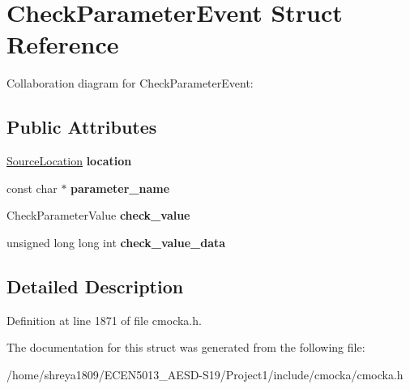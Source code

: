 \hypertarget{structCheckParameterEvent}{}\section{Check\+Parameter\+Event Struct Reference}
\label{structCheckParameterEvent}


Collaboration diagram for Check\+Parameter\+Event\+:
\subsection*{Public Attributes}
\begin{DoxyCompactItemize}
\item 
\mbox{\label{structCheckParameterEvent_afc7dc3d8ae3fcfd65b8b91cfe69f5538}} 
\hyperlink{structSourceLocation}{Source\+Location} {\bfseries location}
\item 
\mbox{\label{structCheckParameterEvent_ae8b4f5e2577e0f749da52a10ac8be8bf}} 
const char $\ast$ {\bfseries parameter\+\_\+name}
\item 
\mbox{\label{structCheckParameterEvent_a2328aae7eccb900e6f3329b7a5e34461}} 
Check\+Parameter\+Value {\bfseries check\+\_\+value}
\item 
\mbox{\label{structCheckParameterEvent_a3641ddfccd5868c1db7225cd4fe3d10b}} 
unsigned long long int {\bfseries check\+\_\+value\+\_\+data}
\end{DoxyCompactItemize}


\subsection{Detailed Description}


Definition at line 1871 of file cmocka.\+h.



The documentation for this struct was generated from the following file\+:\begin{DoxyCompactItemize}
\item 
/home/shreya1809/\+E\+C\+E\+N5013\+\_\+\+A\+E\+S\+D-\/\+S19/\+Project1/include/cmocka/cmocka.\+h\end{DoxyCompactItemize}
